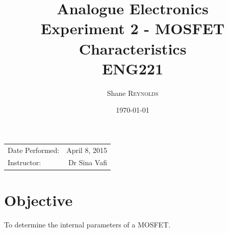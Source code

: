 \documentclass{article}
\title{Analogue Electronics \\ Experiment 2 - MOSFET Characteristics \\ ENG221} %
\author{Shane \textsc{Reynolds}} %
\date{\today} %
\begin{document}
\maketitle %

\begin{center}
\begin{tabular}{l r}
Date Performed: & April 8, 2015 \\ %
Instructor: & Dr Sina Vafi %
\end{tabular}
\end{center}



\section{Objective}

To determine the internal parameters of a MOSFET.
\end{document}

